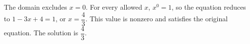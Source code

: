 The domain excludes $x=0$. For every allowed $x$, $x^0=1$, so the equation reduces to $1-3x+4=1$, or $x=\dfrac{4}{3}$. This value is nonzero and satisfies the original equation. The solution is $\boxed{\dfrac{4}{3}}$.
